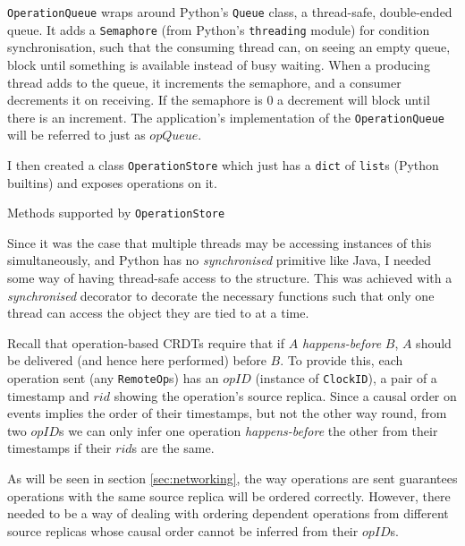 \documentclass[diss.tex]{subfiles}
\begin{document}

\texttt{OperationQueue} wraps around Python's \texttt{Queue} class, a thread-safe, double-ended queue. It adds a \texttt{Semaphore} (from Python's \texttt{threading} module) for condition synchronisation, such that the consuming thread can, on seeing an empty queue, block until something is available instead of busy waiting. When a producing thread adds to the queue, it increments the semaphore, and a consumer decrements it on receiving. If the semaphore is 0 a decrement will block until there is an increment. The application's implementation of the \texttt{OperationQueue} will be referred to just as $opQueue$.

I then created a class \texttt{OperationStore} which just has a \texttt{dict} of \texttt{list}s (Python builtins) and exposes operations on it.

\begin{algorithm}[H]
\caption*{Methods supported by \texttt{OperationStore}}
\begin{algorithmic}[1]
 
\EndFunction
{} 
\EndFunction
\end{algorithmic}
\end{algorithm}

Since it was the case that multiple threads may be accessing instances of this simultaneously, and Python has no \textit{synchronised} primitive like Java, I needed some way of having thread-safe access to the structure. This was achieved with a \textit{synchronised} decorator \cite{synchronised} to decorate the necessary functions such that only one thread can access the object they are tied to at a time.

Recall that operation-based CRDTs require that if $A$ \textit{happens-before} $B$, $A$ should be delivered (and hence here performed) before $B$. To provide this, each operation sent (any \texttt{RemoteOp}s) has an $opID$ (instance of \texttt{ClockID}), a pair of a timestamp and $rid$ showing the operation's source replica. Since a causal order on events implies the order of their timestamps, but not the other way round, from two $opID$s we can only infer one operation \textit{happens-before} the other from their timestamps if their $rid$s are the same. 

As will be seen in section \ref{sec:networking}, the way operations are sent guarantees operations with the same source replica will be ordered correctly. However, there needed to be a way of dealing with ordering dependent operations from different source replicas whose causal order cannot be inferred from their $opID$s.
\end{document}
